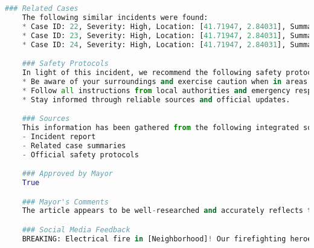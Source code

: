 \begin{lstlisting}[language=Python]
    ### Related Cases
    The following similar incidents were found:
    * Case ID: 22, Severity: High, Location: [41.71947, 2.84031], Summary: The firefighting response was initiated in response to an electrical fire at a location with a high severity rating. The fire posed hazards due to gas cylinders and flammable chemicals, with 5 people trapped inside.
    * Case ID: 23, Severity: High, Location: [41.71947, 2.84031], Summary: The firefighting response was initiated in response to an electrical fire at a location with a high severity rating.
    * Case ID: 24, Severity: High, Location: [41.71947, 2.84031], Summary: Firefighters responded to an electrical fire at 41.71947, 2.84031 with high severity.

    ### Safety Protocols
    In light of this incident, we recommend the following safety protocols:
    * Be aware of your surroundings and exercise caution when in areas where hazardous materials are present.
    * Follow all instructions from local authorities and emergency responders.
    * Stay informed through reliable sources and official updates.

    ### Sources
    This information has been gathered from the following integrated sources:
    - Incident report
    - Related case summaries
    - Official safety protocols

    ### Approved by Mayor
    True

    ### Mayor's Comments
    The article appears to be well-researched and accurately reflects the incident details. However, I would like to see more specificity in the safety protocols section, perhaps highlighting concrete actions residents can take to ensure their own safety. Additionally, it might be beneficial to include a statement about support services available for those affected by the fire.

    ### Social Media Feedback
    BREAKING: Electrical fire in [Neighborhood]! Our firefighting heroes are on the scene, but let's get one thing straight... Why are there THREE identical incidents reported from the same location? Were they separate fires or just a case of copy-paste chaos? Can we get some more transparency on this? Also, great job on having 10 firefighters and 5 paramedics ready to roll in seconds. Your dedication is fire (pun intended)! Just remember, safety protocols are like pizza - even when they're bad, they can still bring people together! #FireSafety #TransparencyMatters

\end{lstlisting}

